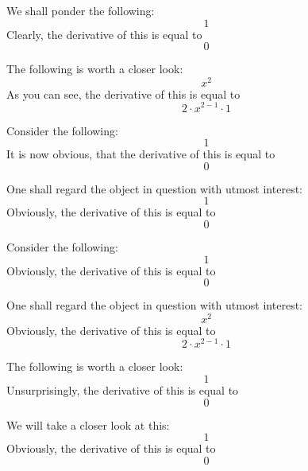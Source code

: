 \documentclass{article}
\begin{document}
We shall ponder the following:
\begin{equation}
1 
\end{equation}
Clearly, the derivative of this is equal to
\begin{equation}
0 
\end{equation}

The following is worth a closer look:
\begin{equation}
x ^{2 } 
\end{equation}
As you can see, the derivative of this is equal to
\begin{equation}
2 \cdot x ^{2 - 1 } \cdot 1 
\end{equation}

Consider the following:
\begin{equation}
1 
\end{equation}
It is now obvious, that the derivative of this is equal to
\begin{equation}
0 
\end{equation}

One shall regard the object in question with utmost interest:
\begin{equation}
1 
\end{equation}
Obviously, the derivative of this is equal to
\begin{equation}
0 
\end{equation}

Consider the following:
\begin{equation}
1 
\end{equation}
Obviously, the derivative of this is equal to
\begin{equation}
0 
\end{equation}

One shall regard the object in question with utmost interest:
\begin{equation}
x ^{2 } 
\end{equation}
Obviously, the derivative of this is equal to
\begin{equation}
2 \cdot x ^{2 - 1 } \cdot 1 
\end{equation}

The following is worth a closer look:
\begin{equation}
1 
\end{equation}
Unsurprisingly, the derivative of this is equal to
\begin{equation}
0 
\end{equation}

We will take a closer look at this:
\begin{equation}
1 
\end{equation}
Obviously, the derivative of this is equal to
\begin{equation}
0 
\end{equation}
\end{document}
